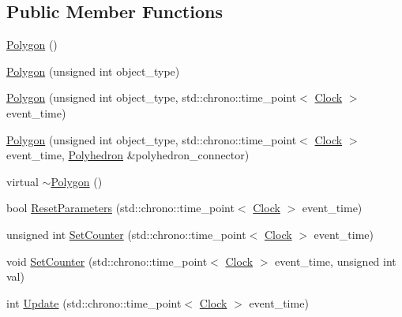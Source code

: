 \subsection*{Public Member Functions}
\begin{DoxyCompactItemize}
\item 
\mbox{\hyperlink{classPolygon_ac183e712f8be1e13f1c9d5b4d4512ead}{Polygon}} ()
\item 
\mbox{\hyperlink{classPolygon_a023fe85caf3682e46fb6d15d03da3435}{Polygon}} (unsigned int object\+\_\+type)
\item 
\mbox{\hyperlink{classPolygon_aa2a7d4a8a7765c45b834a7ecc198e0c3}{Polygon}} (unsigned int object\+\_\+type, std\+::chrono\+::time\+\_\+point$<$ \mbox{\hyperlink{universe_8h_a0ef8d951d1ca5ab3cfaf7ab4c7a6fd80}{Clock}} $>$ event\+\_\+time)
\item 
\mbox{\hyperlink{classPolygon_a581ad88f80bf40668e6c8b928c908bcb}{Polygon}} (unsigned int object\+\_\+type, std\+::chrono\+::time\+\_\+point$<$ \mbox{\hyperlink{universe_8h_a0ef8d951d1ca5ab3cfaf7ab4c7a6fd80}{Clock}} $>$ event\+\_\+time, \mbox{\hyperlink{classPolyhedron}{Polyhedron}} \&polyhedron\+\_\+connector)
\item 
virtual \mbox{\hyperlink{classPolygon_a873f9acee059f717277b6414102dab16}{$\sim$\+Polygon}} ()
\item 
bool \mbox{\hyperlink{classPolygon_a0e2824d12cd6b18c8b14c64ef4b2bf97}{Reset\+Parameters}} (std\+::chrono\+::time\+\_\+point$<$ \mbox{\hyperlink{universe_8h_a0ef8d951d1ca5ab3cfaf7ab4c7a6fd80}{Clock}} $>$ event\+\_\+time)
\item 
unsigned int \mbox{\hyperlink{classPolygon_a344626b07ee8dc40c71c3bec1480d2c2}{Set\+Counter}} (std\+::chrono\+::time\+\_\+point$<$ \mbox{\hyperlink{universe_8h_a0ef8d951d1ca5ab3cfaf7ab4c7a6fd80}{Clock}} $>$ event\+\_\+time)
\item 
void \mbox{\hyperlink{classPolygon_ad12083d8c152a1979b04bead93b6b730}{Set\+Counter}} (std\+::chrono\+::time\+\_\+point$<$ \mbox{\hyperlink{universe_8h_a0ef8d951d1ca5ab3cfaf7ab4c7a6fd80}{Clock}} $>$ event\+\_\+time, unsigned int val)
\item 
int \mbox{\hyperlink{classPolygon_ab3fe58d8ffce2e16589958def88aa188}{Update}} (std\+::chrono\+::time\+\_\+point$<$ \mbox{\hyperlink{universe_8h_a0ef8d951d1ca5ab3cfaf7ab4c7a6fd80}{Clock}} $>$ event\+\_\+time)
\end{DoxyCompactItemize}
